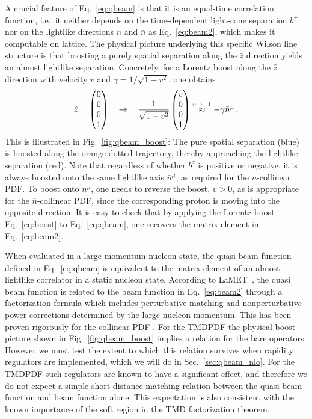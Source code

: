 \documentclass[11pt,a4paper]{article}
\DeclareRobustCommand{\eq}[1]{Eq.~\eqref{eq:#1}}
\DeclareRobustCommand{\fig}[1]{Fig.~\ref{fig:#1}}
\DeclareRobustCommand{\sec}[1]{Sec.~\ref{sec:#1}}
\newcommand{\bn}{{\bar{n}}}
\begin{document}
A crucial feature of \eq{qbeam} is that it is an equal-time correlation function,
i.e.\ it neither depends on the time-dependent light-cone separation $b^+$ nor on the lightlike directions $n$ and $\bn$ as \eq{beam2}, which makes it computable on lattice.
The physical picture underlying this specific Wilson line structure is that boosting a purely spatial separation
along the $\hat z$ direction yields an almost lightlike separation.
Concretely, for a Lorentz boost along the $\hat z$ direction with velocity $v$ and $\gamma=1/\sqrt{1-v^2}$, one obtains
\begin{align} \label{eq:boost}
 \hat z = \left(\begin{matrix} 0 \\ 0 \\ 0 \\ 1 \end{matrix}\right)
 \quad\rightarrow\quad
 {1\over \sqrt{1-v^2}}\left(\begin{matrix} v \\ 0 \\ 0 \\  1 \end{matrix}\right)
 \stackrel{v\to-1}{\approx} - \gamma \bn^\mu
\,.\end{align}
This is illustrated in \fig{qbeam_boost}: The pure spatial separation (blue)
is boosted along the orange-dotted trajectory, thereby approaching the lightlike
separation (red).
Note that regardless of whether $b^z$ is positive or negative,
it is always boosted onto the same lightlike axis $\bn^\mu$, as required for the $n$-collinear PDF.
To boost onto $n^\mu$, one needs to reverse the boost, $v>0$, as is appropriate for the $\bn$-collinear PDF,
since the corresponding proton is moving into the opposite direction.
It is easy to check that by applying the Lorentz boost \eq{boost} to \eq{qbeam}, one recovers the matrix element in \eq{beam2}.

When evaluated in a large-momentum nucleon state, the quasi beam function defined in
\eq{qbeam} is equivalent to the matrix element of an almost-lightlike correlator 
in a static nucleon state. According to LaMET~\cite{Ji:2013dva,Ji:2014gla}, the quasi beam function
is related to the beam function in \eq{beam2} through a factorization formula which includes
perturbative matching and nonperturbative power corrections determined by the large nucleon momentum.
This has been proven rigorously for the collinear PDF \cite{Ma:2014jla,Ma:2014jga,Izubuchi:2018srq}. For the TMDPDF  the physical boost picture shown in \fig{qbeam_boost} implies a relation for the bare operators.  However we must test the extent to which this relation survives when rapidity regulators are implemented, which we will do in \sec{qbeam_nlo}.  For the TMDPDF such regulators are known to have a significant effect, and therefore we do not expect a simple short distance matching relation between the quasi-beam function and beam function alone. This expectation is also consistent with the known importance of the soft region in the TMD factorization theorem.  
\end{document}
